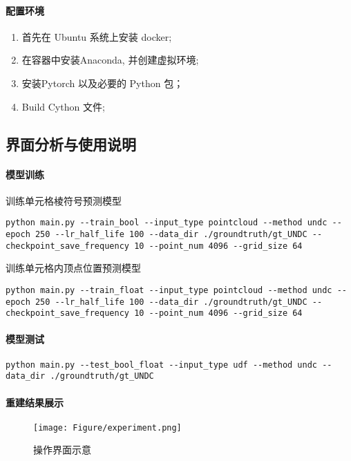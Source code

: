 \paragraph{配置环境}

\begin{enumerate}[i]
	\item 首先在 Ubuntu 系统上安装 docker;
	\item 在容器中安装Anaconda, 并创建虚拟环境;
	\item 安装Pytorch 以及必要的 Python 包；
	\item Build Cython 文件;
\end{enumerate}

\subsection{界面分析与使用说明}







\paragraph{模型训练}
训练单元格棱符号预测模型
\lstset{language=bash}
\begin{lstlisting}
python main.py --train_bool --input_type pointcloud --method undc --epoch 250 --lr_half_life 100 --data_dir ./groundtruth/gt_UNDC --checkpoint_save_frequency 10 --point_num 4096 --grid_size 64 
\end{lstlisting}
训练单元格内顶点位置预测模型
\lstset{language=bash}
\begin{lstlisting}
python main.py --train_float --input_type pointcloud --method undc --epoch 250 --lr_half_life 100 --data_dir ./groundtruth/gt_UNDC --checkpoint_save_frequency 10 --point_num 4096 --grid_size 64
\end{lstlisting}
\paragraph{模型测试}
\lstset{language=bash}
\begin{lstlisting}
python main.py --test_bool_float --input_type udf --method undc --data_dir ./groundtruth/gt_UNDC
\end{lstlisting}
\paragraph{重建结果展示}

\begin{figure}[H]
	\center
	\texttt{[image: Figure/experiment.png]}
	\centering
	\caption{操作界面示意}\label{fig:fig2}
\end{figure}

